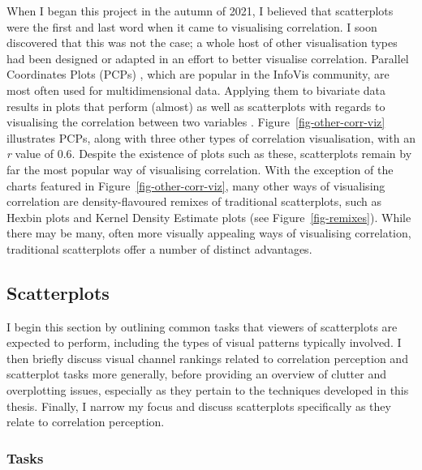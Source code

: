 \documentclass[../main.tex]{subfiles}
\begin{document}
When I began this project in the autumn of 2021, I believed that
scatterplots were the first and last word when it came to visualising
correlation. I soon discovered that this was not the case; a whole host
of other visualisation types had been designed or adapted in an effort
to better visualise correlation. Parallel Coordinates Plots (PCPs)
\cite{heinrich_2013}, which are popular in the InfoVis community, are
most often used for multidimensional data. Applying them to bivariate
data results in plots that perform (almost) as well as scatterplots with
regards to visualising the correlation between two variables
\cite{kay_2016}. Figure~\ref{fig-other-corr-viz} illustrates PCPs, along
with three other types of correlation visualisation, with an \emph{r}
value of 0.6. Despite the existence of plots such as these, scatterplots
remain by far the most popular way of visualising correlation. With the
exception of the charts featured in Figure~\ref{fig-other-corr-viz},
many other ways of visualising correlation are density-flavoured remixes
of traditional scatterplots, such as Hexbin plots and Kernel Density
Estimate plots (see Figure~\ref{fig-remixes}). While there may be many,
often more visually appealing ways of visualising correlation,
traditional scatterplots offer a number of distinct advantages.

\subsection{Scatterplots}\label{scatterplots-corr-viz}

I begin this section by outlining common tasks that viewers of
scatterplots are expected to perform, including the types of visual
patterns typically involved. I then briefly discuss visual channel
rankings related to correlation perception and scatterplot tasks more
generally, before providing an overview of clutter and overplotting
issues, especially as they pertain to the techniques developed in this
thesis. Finally, I narrow my focus and discuss scatterplots specifically
as they relate to correlation perception.

\subsubsection{Tasks}\label{scatterplot-tasks}
\end{document}
